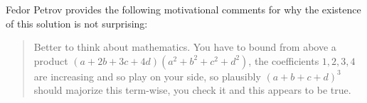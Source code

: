 \begin{remark*}
  Fedor Petrov provides the following motivational comments
  for why the existence of this solution is not surprising:
  \begin{quote}
    Better to think about mathematics.
    You have to bound from above a product $(a+2b+3c+4d)(a^2+b^2+c^2+d^2)$,
    the coefficients $1,2,3,4$ are increasing and so play on your side,
    so plausibly $(a+b+c+d)^3$ should majorize this term-wise,
    you check it and this appears to be true.
  \end{quote}
\end{remark*}

